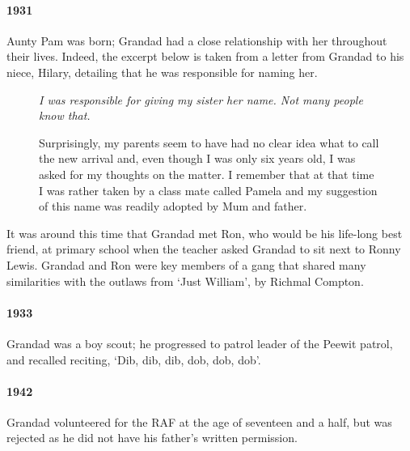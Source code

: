 \paragraph{1931} Aunty Pam was born; Grandad had a close relationship with her throughout their
lives. Indeed, the excerpt below is taken from a letter from Grandad to his niece, Hilary,
detailing that he was responsible for naming her.
\begin{figure}
	\itshape
	I was responsible for giving my sister her name. Not many people know that.

	Surprisingly, my parents seem to have had no clear idea what to call the new arrival and,
	even though I was only six years old, I was asked for my thoughts on the matter. I remember
	that at that time I was rather taken by a class mate called Pamela and my suggestion of this name
	was readily adopted by Mum and father.
\end{figure}

It was around this time that Grandad met Ron, who would be his life-long best friend, at primary
school when the teacher asked Grandad to sit next to Ronny Lewis. Grandad and Ron were key members
of a gang that shared many similarities with the outlaws from `Just William', by Richmal Compton.

\paragraph{1933} Grandad was a boy scout; he progressed to patrol leader of the Peewit
patrol, and recalled reciting, `Dib, dib, dib, dob, dob, dob'.

\paragraph{1942} Grandad volunteered for the RAF at the age of seventeen and a half, but
was rejected as he did not have his father's written permission.
